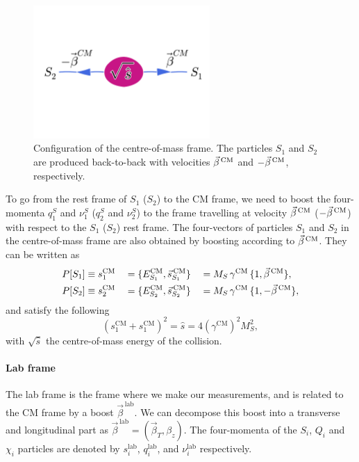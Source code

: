 \begin{figure}[htpb]
  \centering
  \includegraphics[width=0.6\textwidth,clip=true,trim=0 5.5cm 0
4.5cm]{figures/razor_variables/cm_frame} 
  \caption{Configuration of the centre-of-mass frame. The particles $S_1$ and $S_2$ are
produced back-to-back with velocities $\vec{\beta}^{\,\textrm{CM}}$ and $-\vec{\beta}^{\,\textrm{CM}}$, respectively. 
\label{fig:razor_CM_frame}}
\end{figure}

To go from the rest frame of $S_1$ ($S_2$) to the CM frame, we need to boost the four-momenta
$q_1^S$ and $\nu_1^S$ ($q_2^S$ and $\nu_2^S$) to the frame travelling at velocity $\vec{\beta}^{\,\textrm{CM}}$
($-\vec{\beta}^{\,\textrm{CM}}$) with respect to the $S_1$ ($S_2$) rest frame. 
The four-vectors of particles $S_1$ and $S_2$ in the centre-of-mass frame are also obtained by
boosting according to $\vec{\beta}^{\,\textrm{CM}}$. They can be written as
\begin{alignat}{6}
  P[S_1] &\equiv s^{\textrm{CM}}_1  &&= \{ E^{\textrm{CM}}_{S_1} , \vec{s}^{\,\textrm{CM}}_{S_1}\} 
&&= M_S \, \gamma^{\textrm{CM}} \, \{ 1 , \vec{\beta}^{\,\textrm{CM}}\} , \\ 
  P[S_2] &\equiv s^{\textrm{CM}}_2 &&= \{ E^{\textrm{CM}}_{S_2} , \vec{s}^{\,\textrm{CM}}_{S_2}\}
&&= M_S \, \gamma^{\textrm{CM}} \, \{ 1 , -\vec{\beta}^{\,\textrm{CM}}\},  
\end{alignat}
and satisfy the following
\begin{equation}
  (s^{\textrm{CM}}_1 + s^{\textrm{CM}}_1)^2 = \hat{s} = 4 (\gamma^{\textrm{CM}})^2 M_S^2,
\end{equation}
with $\sqrt{\hat{s}}$ the centre-of-mass energy of the collision. 


\paragraph{Lab frame}
The lab frame is the frame where we make our measurements, and is related to the CM frame by a
boost $\vec{\beta}^{\,\textrm{lab}}$. We can decompose this boost into a transverse and longitudinal
part as $\vec{\beta}^{\,\textrm{lab}} = (\vec{\beta}_T,\beta_z)$. 
The four-momenta of the $S_i$, $Q_i$ and $\chi_i$ particles are denoted by $s^{\textrm{lab}}_i$,
$q^{\textrm{lab}}_i$, and $\nu^{\textrm{lab}}_i$ respectively. 



